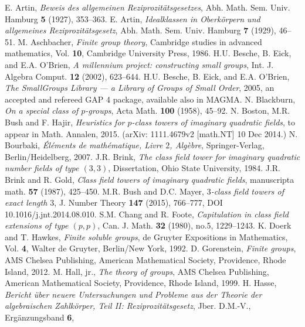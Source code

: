 \documentclass{amsart}
\theoremstyle{definition}
\numberwithin{equation}{section}
\begin{document}
\begin{thebibliography}{XX}
E. Artin,
\textit{Beweis des allgemeinen Reziprozit\"atsgesetzes},
Abh. Math. Sem. Univ. Hamburg
\textbf{5}
(1927),
353--363.
E. Artin,
\textit{Idealklassen in Oberk\"orpern und allgemeines Reziprozit\"atsgesetz},
Abh. Math. Sem. Univ. Hamburg
\textbf{7}
(1929),
46--51.
M. Aschbacher,
\textit{Finite group theory},
Cambridge studies in advanced mathematics,
Vol. \textbf{10},
Cambridge University Press,
1986.
H.U. Besche, B. Eick, and E.A. O'Brien,
\textit{A millennium project: constructing small groups},
Int. J. Algebra Comput.
\textbf{12}
(2002),
623--644.
H.U. Besche, B. Eick, and E.A. O'Brien,
\textit{The SmallGroups Library --- a Library of Groups of Small Order},
2005,
an accepted and refereed GAP 4 package, available also in MAGMA.
N. Blackburn,
\textit{On a special class of \(p\)-groups},
Acta Math.
\textbf{100}
(1958),
45--92.
N. Boston, M.R. Bush and F. Hajir,
\textit{Heuristics for \(p\)-class towers of imaginary quadratic fields},
to appear in Math. Annalen,
2015.
(arXiv: 1111.4679v2 [math.NT] 10 Dec 2014.)
N. Bourbaki,
\textit{\'El\'ements de math\'ematique, Livre \(2\), Alg\`ebre},
Springer-Verlag,
Berlin/Heidelberg,
2007.
J.R. Brink,
\textit{The class field tower for imaginary quadratic number fields of type \((3,3)\)},
Dissertation,
Ohio State University,
1984.
J.R. Brink and R. Gold,
\textit{Class field towers of imaginary quadratic fields},
manuscripta math.
\textbf{57}
(1987),
425--450.
M.R. Bush and D.C. Mayer,
\textit{\(3\)-class field towers of exact length \(3\)},
J. Number Theory
\textbf{147}
(2015),
766--777,
DOI 10.1016/j.jnt.2014.08.010.
S.M. Chang and R. Foote,
\textit{Capitulation in class field extensions of type \((p,p)\)},
Can. J. Math.
\textbf{32}
(1980),
no.5,
1229--1243.
K. Doerk and T. Hawkes,
\textit{Finite soluble groups},
de Gruyter Expositions in Mathematics,
Vol. \textbf{4},
Walter de Gruyter,
Berlin/New York,
1992.
D. Gorenstein,
\textit{Finite groups},
AMS Chelsea Publishing,
American Mathematical Society,
Providence, Rhode Island,
2012.
M. Hall, jr.,
\textit{The theory of groups},
AMS Chelsea Publishing,
American Mathematical Society,
Providence, Rhode Island,
1999.
H. Hasse,
\textit{Bericht \"uber neuere Untersuchungen und Probleme aus der Theorie der algebraischen Zahlk\"orper,
Teil II: Reziprozit\"atsgesetz},
Jber. D.M.-V., Erg\"anzungsband \textbf{6},

\end{thebibliography}
\end{document}

